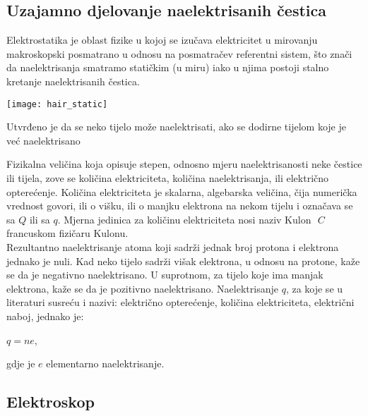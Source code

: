 
	\subsection{Uzajamno djelovanje naelektrisanih čestica}
	
	
	Elektrostatika je oblast fizike u kojoj se izučava elektricitet u mirovanju makroskopski posmatrano u odnosu na posmatračev referentni sistem, što znači da naelektrisanja smatramo statičkim (u miru) iako u njima postoji stalno kretanje naelektrisanih čestica.\\
	
	\begin{marginfigure}%
		\texttt{[image: hair\_static]}
		\caption{Utvrđeno je da se neko tijelo može naelektrisati, ako se dodirne tijelom koje je već naelektrisano}
		\label{fig:hair_static}
	\end{marginfigure} 
	Fizikalna veličina koja opisuje stepen, odnosno mjeru naelektrisanosti neke čestice ili  tijela, zove se količina elektriciteta, količina naelektrisanja, ili električno opterećenje. Količina elektriciteta je skalarna, algebarska veličina, čija numerička vrednost govori, ili o višku, ili o manjku elektrona na nekom tijelu i označava se sa $ Q $ ili sa $ q $. Mjerna jedinica za količinu elektriciteta nosi naziv Kulon $ \textit{ C } $ francuskom fizičaru Kulonu.\\
	
	
	
	Rezultantno naelektrisanje atoma koji sadrži jednak broj protona i elektrona jednako je nuli. Kad neko tijelo sadrži višak elektrona, u odnosu na protone, kaže se da je negativno naelektrisano. U suprotnom, za tijelo koje ima manjak elektrona, kaže se da je pozitivno naelektrisano. Naelektrisanje $ q $, za koje se u literaturi susreću i nazivi: električno opterećenje, količina elektriciteta, električni naboj, jednako je:
	
	
	\begin{center}
		$ q= n e$,
	\end{center} 
	gdje je $ e $ elementarno naelektrisanje.
	\subsection{Elektroskop}
